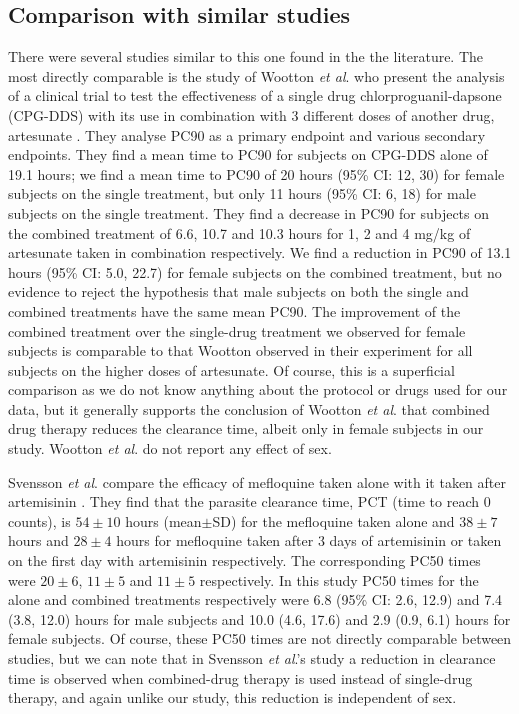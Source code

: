 \subsection{Comparison with similar studies}
There were several studies similar to this one found in the the literature. The most directly comparable is the study of Wootton {\it et al}. who present the analysis of a clinical trial to test the effectiveness of a single drug chlorproguanil-dapsone (CPG-DDS) with its use in combination with 3 different doses of another drug, artesunate \cite{wootton}. They analyse PC90 as a primary endpoint and various secondary endpoints. They find a mean time to PC90 for subjects on CPG-DDS alone of 19.1 hours; we find a mean time to PC90 of 20 hours (95\% CI: 12, 30) for female subjects on the single treatment, but only 11 hours (95\% CI: 6, 18) for male subjects on the single treatment. They find a decrease in PC90 for subjects on the combined treatment of 6.6, 10.7 and 10.3 hours for 1, 2 and 4 mg/kg of artesunate taken in combination respectively. We find a reduction in PC90 of 13.1 hours (95\% CI: 5.0, 22.7) for female subjects on the combined treatment, but no evidence to reject the hypothesis that male subjects on both the single and combined treatments have the same mean PC90. The improvement of the combined treatment over the single-drug treatment we observed for female subjects is comparable to that Wootton observed in their experiment for all subjects on the higher doses of artesunate. Of course, this is a superficial comparison as we do not know anything about the protocol or drugs used for our data, but it generally supports the conclusion of Wootton {\it et al}. that combined drug therapy reduces the clearance time, albeit only in female subjects in our study. Wootton {\it et al}. do not report any effect of sex.

Svensson {\it et al}. compare the efficacy of mefloquine taken alone with it taken after artemisinin \cite{svensson}. They find that the parasite clearance time, PCT (time to reach 0 counts), is $54\pm10$ hours (mean$\pm$SD) for the mefloquine taken alone and $38\pm7$ hours and $28\pm4$ hours for mefloquine taken after 3 days of artemisinin or taken on the first day with artemisinin respectively. The corresponding PC50 times were $20\pm6$, $11\pm5$ and $11\pm5$ respectively. In this study PC50 times for the alone and combined treatments respectively were 6.8 (95\% CI: 2.6, 12.9) and 7.4 (3.8, 12.0) hours for male subjects and 10.0 (4.6, 17.6) and 2.9 (0.9, 6.1) hours for female subjects. Of course, these PC50 times are not directly comparable between studies, but we can note that in Svensson {\it et al}.'s study a reduction in clearance time is observed when combined-drug therapy is used instead of single-drug therapy, and again unlike our study, this reduction is independent of sex.

